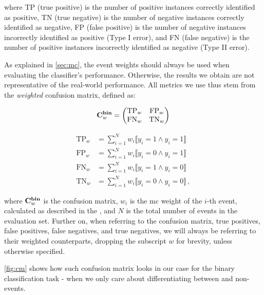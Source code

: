 where TP (true positive) is the number of positive instances correctly identified as positive, TN (true negative) is the
number of negative instances correctly identified as negative, FP (false positive) is the number of negative instances
incorrectly identified as positive (Type I error), and FN (false negative) is the number of positive instances
incorrectly identified as negative (Type II error).

As explained in \autoref{sec:mc}, the event weights should always be used when evaluating the classifier's
performance. Otherwise, the results we obtain are not representative of the real-world performance. All metrics
we use thus stem from the \emph{weighted} confusion matrix, defined as:

\begin{equation}
    \mathbf{C}^{\textbf{bin}}_w = \begin{pmatrix}
        \text{TP}_{w} & \text{FP}_{w} \\
        \text{FN}_{w} & \text{TN}_{w} \\
    \end{pmatrix}
\end{equation}

\begin{align}
    \text{TP}_{w} & = \sum_{i=1}^{N} w_i \llbracket y_i = 1 \land \hat{y}_i = 1 \rrbracket    \\
    \text{FP}_{w} & = \sum_{i=1}^{N} w_i \llbracket y_i = 0 \land \hat{y}_i = 1 \rrbracket    \\
    \text{FN}_{w} & = \sum_{i=1}^{N} w_i \llbracket y_i = 1 \land \hat{y}_i = 0 \rrbracket    \\
    \text{TN}_{w} & = \sum_{i=1}^{N} w_i \llbracket y_i = 0 \land \hat{y}_i = 0 \rrbracket\,,
\end{align}

where $\mathbf{C}^{\textbf{bin}}_w$ is the confusion matrix, $w_i$ is the \gls{mc} weight of the $i$-th event, calculated as described in the
, and $N$ is the total number of events in the evaluation set. Further on, when referring to
the confusion matrix, true positives, false positives, false negatives, and true negatives, we will always be referring
to their weighted counterparts, dropping the subscript $w$ for brevity, unless otherwise specified.

\autoref{fig:cm} shows how such confusion matrix looks in our case for the binary classification task - when we only
care about differentiating between \tth and non-\tth events.

